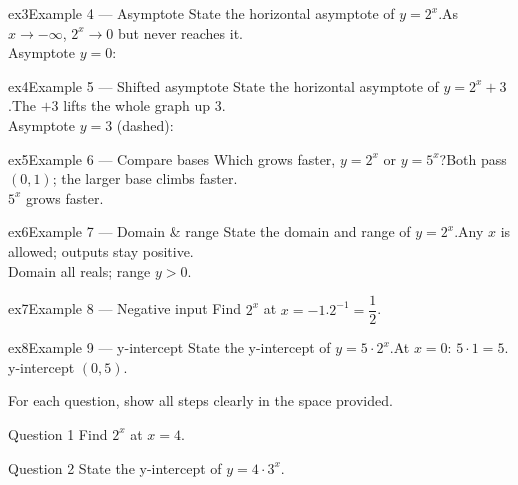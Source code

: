 \documentclass[11pt]{article}
\begin{document}
\begin{example}{ex3}{Example 4 --- Asymptote}
State the horizontal asymptote of $y=2^x$.\soln As $x\to-\infty$, $2^x\to0$ but never reaches it. \\ Asymptote $y=0$:
\end{example}

\begin{example}{ex4}{Example 5 --- Shifted asymptote}
State the horizontal asymptote of $y=2^x+3$.\soln The $+3$ lifts the whole graph up 3. \\ Asymptote $y=3$ (dashed):
\end{example}

\begin{example}{ex5}{Example 6 --- Compare bases}
Which grows faster, $y=2^x$ or $y=5^x$?\soln Both pass $(0,1)$; the larger base climbs faster. \\ $5^x$ grows faster.
\end{example}

\begin{example}{ex6}{Example 7 --- Domain \& range}
State the domain and range of $y=2^x$.\soln Any $x$ is allowed; outputs stay positive. \\ Domain all reals; range $y>0$.
\end{example}

\begin{example}{ex7}{Example 8 --- Negative input}
Find $2^x$ at $x=-1$.\soln $2^{-1}=\dfrac12$.
\end{example}

\begin{example}{ex8}{Example 9 --- y-intercept}
State the y-intercept of $y=5\cdot2^x$.\soln At $x=0$: $5\cdot1=5$. y-intercept $(0,5)$.
\end{example}

\clearpage
{}
For each question, show all steps clearly in the space provided.

\begin{qbox}{Question 1}
Find $2^x$ at $x=4$.\workspace{2.4cm}
\end{qbox}

\begin{qbox}{Question 2}
State the y-intercept of $y=4\cdot3^x$.\workspace{2.4cm}
\end{qbox}
\end{document}
